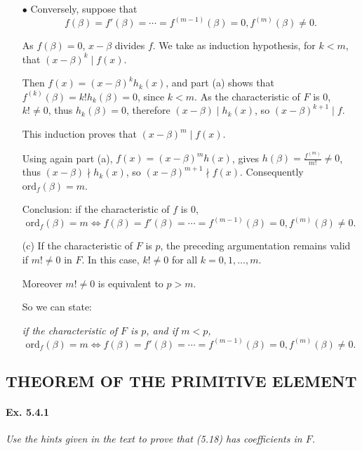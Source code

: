 \documentclass[11pt,a4paper]{article}
\begin{document}
\begin{enumerate}
$\bullet$ Conversely, suppose that $$f(\beta) = f'(\beta) = \cdots = f^{(m-1)}(\beta) = 0, f^{(m)}(\beta)\neq 0.$$

As $f(\beta) = 0$, $x-\beta$ divides $f$. We take as induction hypothesis,  for $k<m$, that $(x-\beta)^k \mid f(x)$.

Then $f(x) = (x-\beta)^k h_k(x)$, and part (a) shows that $f^{(k)}(\beta) = k!h_k(\beta)=0$, since $k<m$. As the characteristic of $F$ is 0, $k!\neq 0$, thus $h_k(\beta)=0$, therefore $(x-\beta) \mid h_k(x)$, so $(x-\beta)^{k+1} \mid f$. 

This induction proves that $(x-\beta)^{m} \mid f(x)$. 

Using again part (a), $f(x) = (x-\beta)^{m} h(x)$, gives $h(\beta) = \frac{f^{(m)}}{m!} \neq 0$, thus $(x-\beta) \nmid h_k(x)$, so  $(x-\beta)^{m+1} \nmid f(x)$. 
Consequently $\mathrm{ord}_f(\beta) = m$.

Conclusion: if the characteristic of $f$ is 0, $$\mathrm{ord}_f(\beta)=m \iff f(\beta) = f'(\beta) = \cdots = f^{(m-1)}(\beta) = 0, f^{(m)}(\beta)\neq 0.$$


\item[(c)] If the characteristic of $F$ is $p$, the preceding argumentation remains valid if $m!\neq 0$ in $F$. In this case,  $k!\neq 0$ for all $k=0,1,\ldots,m$.

Moreover $m!\neq 0$ is equivalent to $p>m$.

So we can state:

{\it if the characteristic of $F$ is $p$, and if $m<p$, $$\mathrm{ord}_f(\beta)=m \iff f(\beta) = f'(\beta) = \cdots = f^{(m-1)}(\beta) = 0, f^{(m)}(\beta)\neq 0.$$}
\end{enumerate}

\subsection{THEOREM OF THE PRIMITIVE ELEMENT}
\paragraph{Ex. 5.4.1}

{\it Use the hints given in the text to prove that (5.18) has coefficients in $F$.
}
\end{document}
